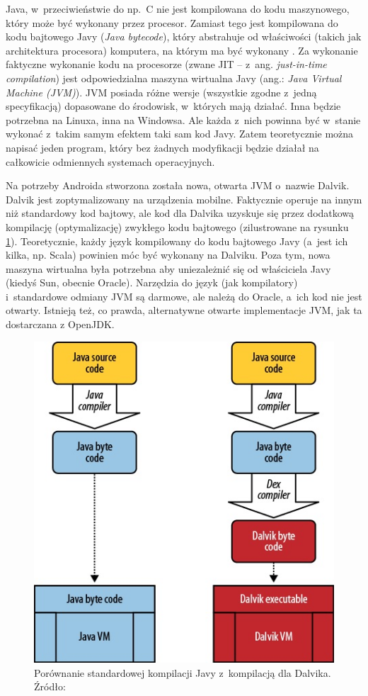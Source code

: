 Java, w~przeciwieństwie do np.~C nie jest kompilowana do kodu maszynowego, który może być wykonany przez procesor. Zamiast tego jest kompilowana do kodu bajtowego Javy (\emph{Java bytecode}), który abstrahuje od właściwości (takich jak architektura procesora) komputera, na którym ma być wykonany \cite{jvm}. Za wykonanie faktyczne wykonanie kodu na procesorze (zwane JIT -- z~ang. \emph{just-in-time compilation}) jest odpowiedzialna maszyna wirtualna Javy (ang.: \emph{Java Virtual Machine (JVM)}). JVM posiada różne wersje (wszystkie zgodne z~jedną specyfikacją) dopasowane do środowisk, w~których mają działać. Inna będzie potrzebna na Linuxa, inna na Windowsa. Ale każda z~nich powinna być w~stanie wykonać z~takim samym efektem taki sam kod Javy. Zatem teoretycznie można napisać jeden program, który bez żadnych modyfikacji będzie działał na całkowicie odmiennych systemach operacyjnych.

Na potrzeby Androida stworzona została nowa, otwarta JVM o~nazwie Dalvik. Dalvik jest zoptymalizowany na urządzenia mobilne. Faktycznie operuje na innym niż standardowy kod bajtowy, ale kod dla Dalvika uzyskuje się przez dodatkową kompilację (optymalizację) zwykłego kodu bajtowego (zilustrowane na rysunku \ref{fig:dalvik-compilation}). Teoretycznie, każdy język kompilowany do kodu bajtowego Javy (a~jest ich kilka, np. Scala) powinien móc być wykonany na Dalviku.
Poza tym, nowa maszyna wirtualna była potrzebna aby uniezależnić się od właściciela Javy (kiedyś Sun, obecnie Oracle). Narzędzia do język (jak kompilatory) i~standardowe odmiany JVM są darmowe, ale należą do Oracle, a~ich kod nie jest otwarty. Istnieją też, co prawda, alternatywne otwarte implementacje JVM, jak ta dostarczana z OpenJDK.

\begin{figure}
	\centering
		\includegraphics[scale=0.75]{img/dalvik-compilation.jpg}
	\caption{Porównanie standardowej kompilacji Javy z~kompilacją dla Dalvika. Źródło: \cite{learningandroid}}
	\label{fig:dalvik-compilation}
\end{figure}

